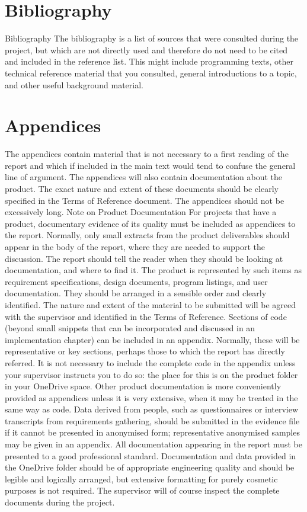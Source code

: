 \documentclass[11pt, twoside, a4paper]{report}
\newcommand{\todoinline}[1]{
    \begin{sloppypar}
        \colorlet{todo old}{.}
        \color{red}
        #1
        \color{todo old}
        \todo{See inline comment}
    \end{sloppypar}
}
\begin{document}
\chapter{Bibliography}
\todoinline{
    Bibliography
    The bibliography is a list of sources that were consulted during the project, but which are not directly used and therefore do not need to be cited and included in
    the reference list. This might include programming texts, other technical reference material that you consulted, general introductions to a topic, and other useful
    background material.
}

\chapter{Appendices}
\todoinline{
    The appendices contain material that is not necessary to a first reading of the report and which if included in the main text would tend to confuse the general line
    of argument. The appendices will also contain documentation about the product. The exact nature and extent of these documents should be clearly specified in the Terms
    of Reference document. The appendices should not be excessively long.
    Note on Product Documentation
    For projects that have a product, documentary evidence of its quality must be included as appendices to the report. Normally, only small extracts from the product
    deliverables should appear in the body of the report, where they are needed to support the discussion. The report should tell the reader when they should be looking
    at documentation, and where to find it.
    The product is represented by such items as requirement specifications, design documents, program listings, and user documentation. They should be arranged in a
    sensible order and clearly identified. The nature and extent of the material to be submitted will be agreed with the supervisor and identified in the Terms of Reference.
    Sections of code (beyond small snippets that can be incorporated and discussed in an implementation chapter) can be included in an appendix. Normally, these will be
    representative or key sections, perhaps those to which the report has directly referred. It is not necessary to include the complete code in the appendix unless your
    supervisor instructs you to do so: the place for this is on the product folder in your OneDrive space.
    Other product documentation is more conveniently provided as appendices unless it is very extensive, when it may be treated in the same way as code. Data derived from
    people, such as questionnaires or interview transcripts from requirements gathering, should be submitted in the evidence file if it cannot be presented in anonymised
    form; representative anonymised samples may be given in an appendix.
    All documentation appearing in the report must be presented to a good professional standard. Documentation and data provided in the OneDrive folder should be of
    appropriate engineering quality and should be legible and logically arranged, but extensive formatting for purely cosmetic purposes is not required. The supervisor
    will of course inspect the complete documents during the project.
}
\end{document}

